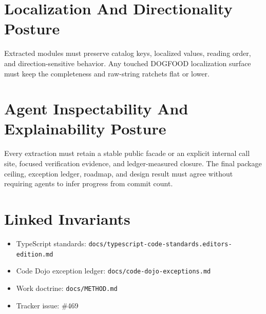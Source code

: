 \section{Localization And Directionality Posture}\label{record-245-localization-and-directionality-posture}

Extracted modules must preserve catalog keys, localized values, reading order, and direction-sensitive behavior. Any touched DOGFOOD localization surface must keep the completeness and raw-string ratchets flat or lower.

\section{Agent Inspectability And Explainability Posture}\label{record-245-agent-inspectability-and-explainability-posture}

Every extraction must retain a stable public facade or an explicit internal call site, focused verification evidence, and ledger-measured closure. The final package ceiling, exception ledger, roadmap, and design result must agree without requiring agents to infer progress from commit count.

\section{Linked Invariants}\label{record-245-linked-invariants}

\begin{itemize}
\tightlist
\item
  TypeScript standards: \texttt{d\allowbreak{}o\allowbreak{}c\allowbreak{}s\allowbreak{}/\allowbreak{}t\allowbreak{}y\allowbreak{}p\allowbreak{}e\allowbreak{}s\allowbreak{}c\allowbreak{}r\allowbreak{}i\allowbreak{}p\allowbreak{}t\allowbreak{}-\allowbreak{}c\allowbreak{}o\allowbreak{}d\allowbreak{}e\allowbreak{}-\allowbreak{}s\allowbreak{}t\allowbreak{}a\allowbreak{}n\allowbreak{}d\allowbreak{}a\allowbreak{}r\allowbreak{}d\allowbreak{}s\allowbreak{}.\allowbreak{}e\allowbreak{}d\allowbreak{}i\allowbreak{}t\allowbreak{}o\allowbreak{}r\allowbreak{}s\allowbreak{}-\allowbreak{}e\allowbreak{}d\allowbreak{}i\allowbreak{}t\allowbreak{}i\allowbreak{}o\allowbreak{}n\allowbreak{}.\allowbreak{}m\allowbreak{}d}
\item
  Code Dojo exception ledger: \texttt{d\allowbreak{}o\allowbreak{}c\allowbreak{}s\allowbreak{}/\allowbreak{}c\allowbreak{}o\allowbreak{}d\allowbreak{}e\allowbreak{}-\allowbreak{}d\allowbreak{}o\allowbreak{}j\allowbreak{}o\allowbreak{}-\allowbreak{}e\allowbreak{}x\allowbreak{}c\allowbreak{}e\allowbreak{}p\allowbreak{}t\allowbreak{}i\allowbreak{}o\allowbreak{}n\allowbreak{}s\allowbreak{}.\allowbreak{}m\allowbreak{}d}
\item
  Work doctrine: \texttt{d\allowbreak{}o\allowbreak{}c\allowbreak{}s\allowbreak{}/\allowbreak{}M\allowbreak{}E\allowbreak{}T\allowbreak{}H\allowbreak{}O\allowbreak{}D\allowbreak{}.\allowbreak{}m\allowbreak{}d}
\item
  Tracker issue: \#469
\end{itemize}

